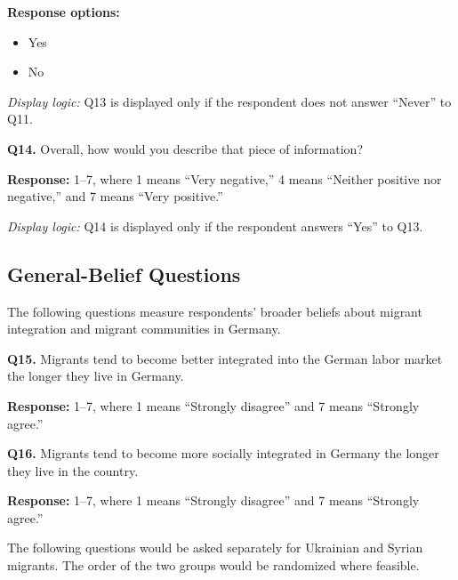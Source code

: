 \smallskip

\noindent\textbf{Response options:}

\begin{itemize}
    \item Yes
    \item No
\end{itemize}

\smallskip

\noindent
\textit{Display logic:} Q13 is displayed only if the respondent does not
answer ``Never'' to Q11.

\medskip

\noindent\textbf{Q14.}
Overall, how would you describe that piece of information?

\smallskip

\noindent
\textbf{Response:} 1--7, where 1 means ``Very negative,''
4 means ``Neither positive nor negative,'' and 7 means ``Very positive.''

\smallskip

\noindent
\textit{Display logic:} Q14 is displayed only if the respondent answers
``Yes'' to Q13.

\subsection{General-Belief Questions}

The following questions measure respondents' broader beliefs about migrant
integration and migrant communities in Germany.

\medskip

\noindent\textbf{Q15.}
Migrants tend to become better integrated into the German labor market the
longer they live in Germany.

\smallskip

\noindent
\textbf{Response:} 1--7, where 1 means ``Strongly disagree'' and
7 means ``Strongly agree.''

\medskip

\noindent\textbf{Q16.}
Migrants tend to become more socially integrated in Germany the longer they
live in the country.

\smallskip

\noindent
\textbf{Response:} 1--7, where 1 means ``Strongly disagree'' and
7 means ``Strongly agree.''

\medskip

\noindent
The following questions would be asked separately for Ukrainian and Syrian
migrants. The order of the two groups would be randomized where feasible.

